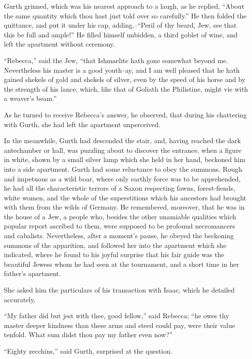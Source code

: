 Gurth grinned, which was his nearest approach to a laugh, as he replied,
``About the same quantity which thou hast just told over so carefully.''
He then folded the quittance, and put it under his cap, adding,--``Peril
of thy beard, Jew, see that this be full and ample!'' He filled himself
unbidden, a third goblet of wine, and left the apartment without
ceremony.

``Rebecca,'' said the Jew, ``that Ishmaelite hath gone somewhat beyond
me. Nevertheless his master is a good youth--ay, and I am well pleased
that he hath gained shekels of gold and shekels of silver, even by the
speed of his horse and by the strength of his lance, which, like that of
Goliath the Philistine, might vie with a weaver's beam.''

As he turned to receive Rebecca's answer, he observed, that during his
chattering with Gurth, she had left the apartment unperceived.

In the meanwhile, Gurth had descended the stair, and, having reached the
dark antechamber or hall, was puzzling about to discover the entrance,
when a figure in white, shown by a small silver lamp which she held in
her hand, beckoned him into a side apartment. Gurth had some reluctance
to obey the summons. Rough and impetuous as a wild boar, where only
earthly force was to be apprehended, he had all the characteristic
terrors of a Saxon respecting fawns, forest-fiends, white women, and the
whole of the superstitions which his ancestors had brought with them
from the wilds of Germany. He remembered, moreover, that he was in the
house of a Jew, a people who, besides the other unamiable qualities
which popular report ascribed to them, were supposed to be profound
necromancers and cabalists. Nevertheless, after a moment's pause, he
obeyed the beckoning summons of the apparition, and followed her into
the apartment which she indicated, where he found to his joyful surprise
that his fair guide was the beautiful Jewess whom he had seen at the
tournament, and a short time in her father's apartment.

She asked him the particulars of his transaction with Isaac, which he
detailed accurately.

``My father did but jest with thee, good fellow,'' said Rebecca; ``he
owes thy master deeper kindness than these arms and steed could pay,
were their value tenfold. What sum didst thou pay my father even now?''

``Eighty zecchins,'' said Gurth, surprised at the question.

